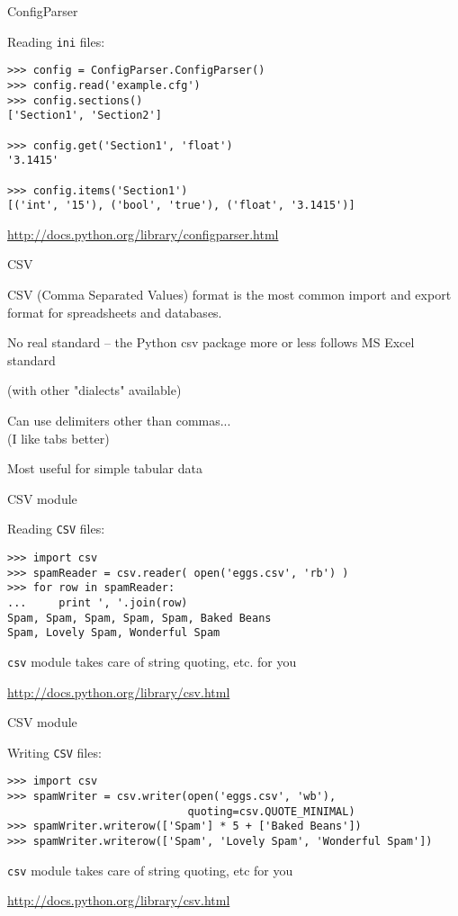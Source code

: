 \documentclass{beamer}
\begin{document}
\begin{frame}[fragile]{ConfigParser}

{\Large Reading \verb|ini| files:}

\begin{verbatim}
>>> config = ConfigParser.ConfigParser()
>>> config.read('example.cfg')
>>> config.sections()
['Section1', 'Section2']

>>> config.get('Section1', 'float')
'3.1415'

>>> config.items('Section1')
[('int', '15'), ('bool', 'true'), ('float', '3.1415')]
\end{verbatim}

\vfill
\url{http://docs.python.org/library/configparser.html}
\end{frame}

\begin{frame}[fragile]{CSV}

{\Large CSV (Comma Separated Values) format is the
most common import and export format for spreadsheets and databases.}

\vfill
{\Large No real standard -- the Python csv package more or less follows MS Excel standard}

(with other "dialects" available)

\vfill
{\Large Can use delimiters other than commas...}\\
(I like tabs better)

\vfill
{\Large Most useful for simple tabular data}

\end{frame}

\begin{frame}[fragile]{CSV module}

{\Large Reading \verb|CSV| files:}

\begin{verbatim}
>>> import csv
>>> spamReader = csv.reader( open('eggs.csv', 'rb') )
>>> for row in spamReader:
...     print ', '.join(row)
Spam, Spam, Spam, Spam, Spam, Baked Beans
Spam, Lovely Spam, Wonderful Spam
\end{verbatim}

\vfill
{\verb|csv| module takes care of string quoting, etc. for you}

\vfill
\url{http://docs.python.org/library/csv.html}
\end{frame}



\begin{frame}[fragile]{CSV module}

{\Large Writing \verb|CSV| files:}

\begin{verbatim}
>>> import csv
>>> spamWriter = csv.writer(open('eggs.csv', 'wb'), 
                            quoting=csv.QUOTE_MINIMAL)
>>> spamWriter.writerow(['Spam'] * 5 + ['Baked Beans'])
>>> spamWriter.writerow(['Spam', 'Lovely Spam', 'Wonderful Spam'])
\end{verbatim}

\vfill
{\verb|csv| module takes care of string quoting, etc for you}

\vfill
\url{http://docs.python.org/library/csv.html}
\end{frame}
\end{document}
